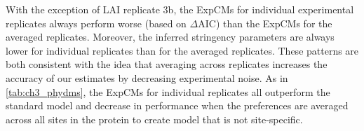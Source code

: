\documentclass[9pt,lineno]{elife}
\begin{document}
\begin{table}
\begin{flushleft}
With the exception of LAI replicate 3b, the ExpCMs for individual experimental replicates always perform worse (based on $\Delta$AIC) than the ExpCMs for the averaged replicates.
Moreover, the inferred stringency parameters are always lower for individual replicates than for the averaged replicates.
These patterns are both consistent with the idea that averaging across replicates increases the accuracy of our estimates by decreasing experimental noise.
As in \ref{tab:ch3_phydms}, the ExpCMs for individual replicates all outperform the standard model and decrease in performance when the preferences are averaged across all sites in the protein to create model that is not site-specific.
\end{flushleft}
\label{tab:ch3_phydms_groupM_supp}
\end{table}
\end{document}
